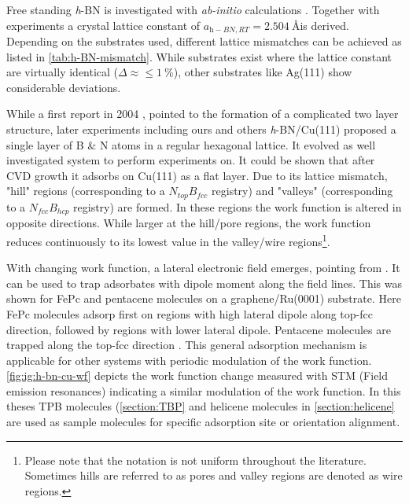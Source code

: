 Free standing \textit{h}-BN is investigated with \textit{ab-initio} calculations \cite{han_effects_2014,mortazavi_investigation_2012,topsakal_first-principles_2009,peng_mechanical_2012}. Together with experiments \cite{paszkowicz_lattice_2002} a crystal lattice constant of $a_{\textit{h}-BN, RT}=\SI{2.504}{\angstrom} $is derived. Depending on the substrates used, different lattice mismatches can be achieved as listed in \autoref{tab:h-BN-mismatch}. While substrates exist where the lattice constant are virtually identical ($\Delta \approx \leq \SI{1}{\percent}$), other substrates like Ag(111) show considerable deviations.

While a first report in 2004 \cite{corso_boron_2004}, pointed to the formation of a complicated two layer structure, later experiments \cite{roth_chemical_2013, li_grain_2015} including ours \cite{joshi_boron_2012, schwarz_corrugation_2017} and others  \textit{h}-BN/Cu(111) proposed a single layer of B \& N atoms in a regular hexagonal lattice. It evolved as well investigated system to perform experiments on. It could be shown that after CVD growth it adsorbs on Cu(111) as a flat layer. Due to its  lattice mismatch, "hill" regions  (corresponding to a $N_{top}B_{fcc}$ registry) and "valleys" (corresponding to a $N_{fcc}B_{hcp}$ registry) are formed. In these regions the work function is altered in opposite directions. While larger at the hill/pore regions, the work function reduces continuously to its lowest value in the valley/wire regions\footnote{Please note that the notation is not uniform throughout the literature. Sometimes hills are referred to as pores and valley regions are denoted as wire regions.}. 

With changing work function, a lateral electronic field emerges, pointing from \underline{\qquad \qquad}. It can be used to trap adsorbates with dipole moment along the field lines. This was shown for FePc and pentacene molecules on a graphene/Ru(0001) substrate. Here FePc molecules adsorp first on regions with high lateral dipole along top-fcc direction, followed by regions with lower lateral dipole. Pentacene molecules are trapped along the top-fcc direction \cite{zhang_assembly_2011}. This general adsorption mechanism is applicable for other systems with periodic modulation of the work function. \autoref{fig:ig:h-bn-cu-wf} depicts the work function change measured  with STM (Field emission resonances) indicating a similar modulation of the work function. In this theses TPB molecules (\autoref{section:TBP} and helicene molecules in \autoref{section:helicene} are used as sample molecules for specific adsorption site or orientation alignment.

